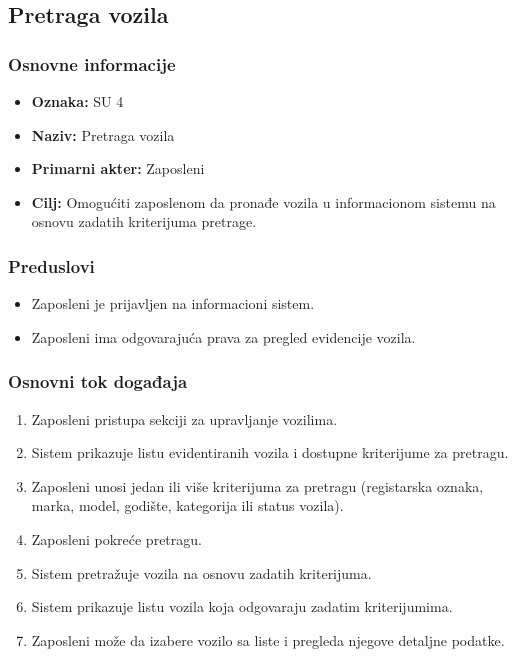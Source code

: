 
\subsection{Pretraga vozila}

\subsubsection{Osnovne informacije}

\begin{itemize}
    \item \textbf{Oznaka:} SU 4
    \item \textbf{Naziv:} Pretraga vozila
    \item \textbf{Primarni akter:} Zaposleni
    \item \textbf{Cilj:} Omogućiti zaposlenom da pronađe vozila u informacionom sistemu na osnovu zadatih kriterijuma pretrage.
\end{itemize}

\subsubsection{Preduslovi}

\begin{itemize}
    \item Zaposleni je prijavljen na informacioni sistem.
    \item Zaposleni ima odgovarajuća prava za pregled evidencije vozila.
\end{itemize}

\subsubsection{Osnovni tok događaja}

\begin{enumerate}
    \item Zaposleni pristupa sekciji za upravljanje vozilima.
    \item Sistem prikazuje listu evidentiranih vozila i dostupne kriterijume za pretragu.
    \item Zaposleni unosi jedan ili više kriterijuma za pretragu (registarska oznaka, marka, model, godište, kategorija ili status vozila).
    \item Zaposleni pokreće pretragu.
    \item Sistem pretražuje vozila na osnovu zadatih kriterijuma.
    \item Sistem prikazuje listu vozila koja odgovaraju zadatim kriterijumima.
    \item Zaposleni može da izabere vozilo sa liste i pregleda njegove detaljne podatke.
\end{enumerate}

